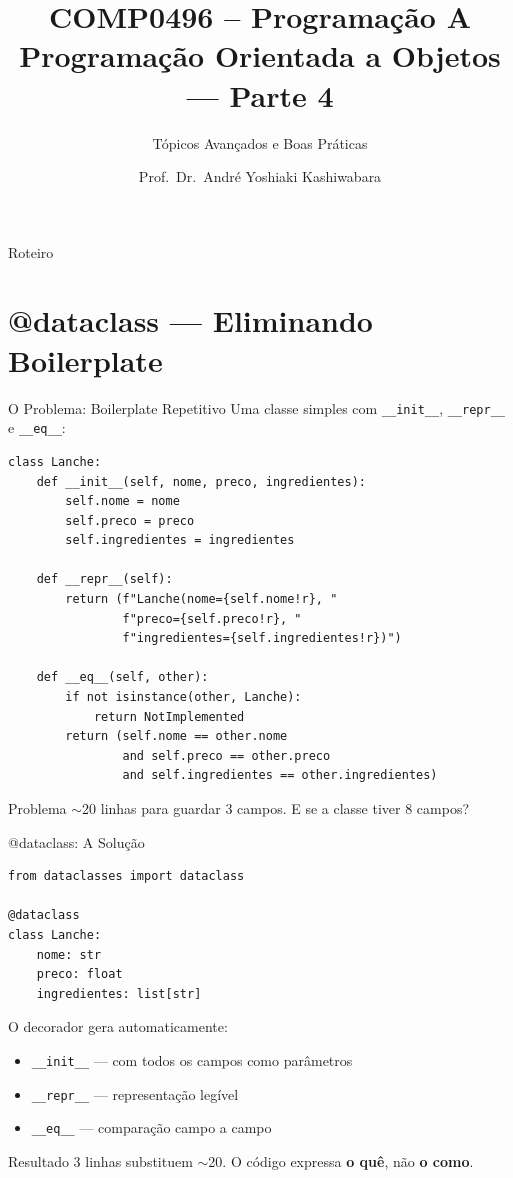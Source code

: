\documentclass[aspectratio=169]{beamer}
\title{COMP0496 -- Programação A \\ Programação Orientada a Objetos --- Parte 4}
\subtitle{Tópicos Avançados e Boas Práticas}
\author{Prof.\ Dr.\ André Yoshiaki Kashiwabara}
\institute{DCOMP -- Universidade Federal de Sergipe\\\texttt{andreyoshiaki@dcomp.ufs.br}}
\date{}
\begin{document}
\begin{frame}
\titlepage
\end{frame}

\begin{frame}{Roteiro}
\tableofcontents
\end{frame}

\section{@dataclass --- Eliminando Boilerplate}

\begin{frame}[fragile]{O Problema: Boilerplate Repetitivo}
Uma classe simples com \texttt{\_\_init\_\_}, \texttt{\_\_repr\_\_} e \texttt{\_\_eq\_\_}:

\begin{lstlisting}
class Lanche:
    def __init__(self, nome, preco, ingredientes):
        self.nome = nome
        self.preco = preco
        self.ingredientes = ingredientes

    def __repr__(self):
        return (f"Lanche(nome={self.nome!r}, "
                f"preco={self.preco!r}, "
                f"ingredientes={self.ingredientes!r})")

    def __eq__(self, other):
        if not isinstance(other, Lanche):
            return NotImplemented
        return (self.nome == other.nome
                and self.preco == other.preco
                and self.ingredientes == other.ingredientes)
\end{lstlisting}

\begin{alertblock}{Problema}
$\sim$20 linhas para guardar 3 campos. E se a classe tiver 8 campos?
\end{alertblock}
\end{frame}

\begin{frame}[fragile]{@dataclass: A Solução}
\begin{lstlisting}
from dataclasses import dataclass

@dataclass
class Lanche:
    nome: str
    preco: float
    ingredientes: list[str]
\end{lstlisting}

O decorador gera automaticamente:
\begin{itemize}
  \item \texttt{\_\_init\_\_} --- com todos os campos como parâmetros
  \item \texttt{\_\_repr\_\_} --- representação legível
  \item \texttt{\_\_eq\_\_} --- comparação campo a campo
\end{itemize}

\begin{exampleblock}{Resultado}
3 linhas substituem $\sim$20. O código expressa \textbf{o quê}, não \textbf{o como}.
\end{exampleblock}
\end{frame}
\end{document}
